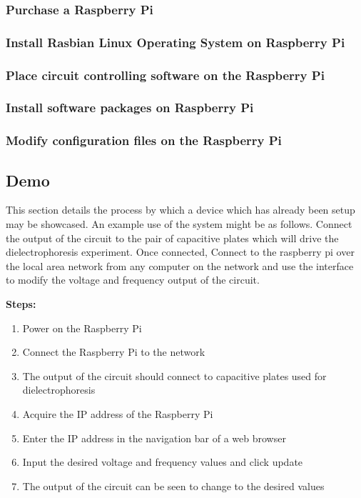 \documentclass{article}	%
\begin{document}
\begin{multicols}{2}
\subsubsection{Purchase a Raspberry Pi}


\subsubsection{Install Rasbian Linux Operating System on Raspberry Pi}

\subsubsection{Place circuit controlling software on the Raspberry Pi}

\subsubsection{Install software packages on Raspberry Pi}

\subsubsection{Modify configuration files on the Raspberry Pi}

\subsection{Demo}
This section details the process
by which a device which has already
been setup may be showcased.
An example use of the system might be as follows.
Connect the output of the circuit to the pair
of capacitive plates which will drive 
the dielectrophoresis experiment.
Once connected,
Connect to the raspberry pi over
the local area network from
any computer on the network and
use the interface to modify the
voltage and frequency output of the circuit.

\textbf{Steps:}
\begin{enumerate}
\item{Power on the Raspberry Pi}
\item{Connect the Raspberry Pi to the network}
\item{The output of the circuit should connect to capacitive plates used for dielectrophoresis}
\item{Acquire the IP address of the Raspberry Pi}
\item{Enter the IP address in the navigation bar of a web browser}
\item{Input the desired voltage and frequency values and click update}
\item{The output of the circuit can be seen to change to the desired values}
\end{enumerate}


\end{multicols}
\end{document}
